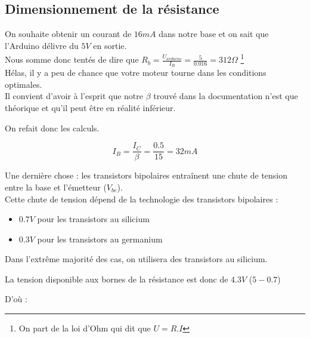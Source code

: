 
    \subsection{Dimensionnement de la résistance}

    On souhaite obtenir un courant de $16 mA$ dans notre base et on sait que l'Arduino délivre du $5V$ en sortie.\\

    Nous somme donc tentés de dire que $R_b = \frac{U_{arduino}}{ I_{B}} = \frac{5}{0.016} = 312 \Omega$ \footnote{On part de la loi d'Ohm qui dit que $U=R.I$}\\


    Hélas, il y a peu de chance que votre moteur tourne dans les conditions optimales.\\
    Il convient d'avoir à l'esprit que notre $\beta$ trouvé dans la documentation n'est que théorique et qu'il peut être en réalité inférieur.

    
    On refait donc les calculs.

    $$  I_{B} = \frac{I_{C}}{\beta} = \frac{0.5}{15} = 32 mA $$

    Une dernière chose : les transistors bipolaires entraînent une chute de tension entre la base et l'émetteur ($V_{be}$).\\
    Cette chute de tension dépend de la technologie des transistors bipolaires : 

    \begin{itemize}

      \item $0.7V$ pour les transistors au silicium
      \item $0.3V$ pour les transistors au germanium
    \end{itemize}
    Dans l'extrême majorité des cas, on utilisera des transistors au silicium.

    La tension disponible aux bornes de la résistance est donc de $4.3V$ ($5-0.7$)

    D'où : 

